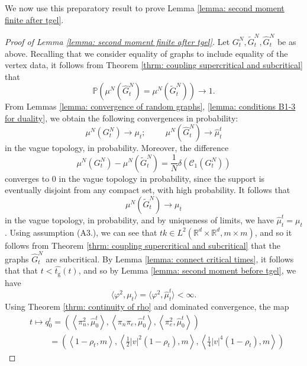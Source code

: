 \documentclass[11pt, notitlepage]{article}
\begin{document}
We now use this preparatory result to prove Lemma \ref{lemma: second moment finite after tgel}. \begin{proof}[Proof of Lemma \ref{lemma: second moment finite after tgel}] Let $G^N_t, \widetilde{G}^N_t, \widehat{G}^N_t$ be as above. Recalling that we consider equality of graphs to include equality of the vertex data, it follows from Theorem \ref{thrm: coupling supercritical and subcritical} that \begin{equation} \mathbb{P}(\mu^N(\widehat{G}^N_t)=\mu^N(\widetilde{G}^N_t))\rightarrow 1. \end{equation}  From Lemmas \ref{lemma: convergence of random graphs}, \ref{lemma: conditions B1-3 for duality}, we obtain the following convergences in probability:
\begin{equation}
    \mu^N(G^N_{t})\rightarrow {\mu}_{t};\hspace{1cm}
    \mu^N(\widehat{G}^N_{t})\rightarrow \widehat{\mu}^t_{t}
\end{equation} in the vague topology, in probability.  Moreover, the difference \begin{equation}
    \mu^N(G^N_{t})-\mu^N(\widetilde{G}^N_{t})=\frac{1}{N}\delta(\mathcal{C}_1(G^N_{t}))
\end{equation} converges to $0$ in the vague topology in probability, since the support is eventually disjoint from any compact set, with high probability. It follows that \begin{equation}
    \mu^N(\widetilde{G}^N_{t})\rightarrow \mu_{t}
\end{equation} in the vague topology, in probability, and by uniqueness of limits, we have $\widehat{\mu}^t_{t}=\mu_{t}$. Using assumption ({A3.}), we can see that $t k\in L^2(\mathbb{R}^d\times \mathbb{R}^d,m\times m)$, and so it follows from Theorem \ref{thrm: coupling supercritical and subcritical} that the graphs $\widehat{G}^N_{t}$ are subcritical. By Lemma \ref{lemma: connect critical times}, it follows that that  $t<\widehat{t_\mathrm{g}}(t)$, and so by Lemma \ref{lemma: second moment before tgel}, we have \begin{equation}
   \langle \varphi^2, \mu_t\rangle = \langle \varphi^2, \widehat{\mu}^t_{t}\rangle <\infty.
\end{equation} Using Theorem \ref{thrm: continuity of rho} and dominated convergence, the map \begin{equation}\begin{split}
   & t\mapsto q^t_0=\left(\left\langle \pi_n^2, \widehat{\mu}^t_0\right\rangle,\left\langle \pi_n\pi_e, \widehat{\mu}^t_0\right\rangle,\left\langle \pi_e^2, \widehat{\mu}^t_0\right\rangle\right)\\&\hspace{1cm}=\left(\left\langle 1-\rho_t,m\right\rangle,\left\langle \frac{1}{2}|v|^2(1-\rho_t),m\right\rangle,\left\langle \frac{1}{4}|v|^4(1-\rho_t),m\right\rangle\right) \end{split}

\end{equation}
\end{proof}
\end{document}

